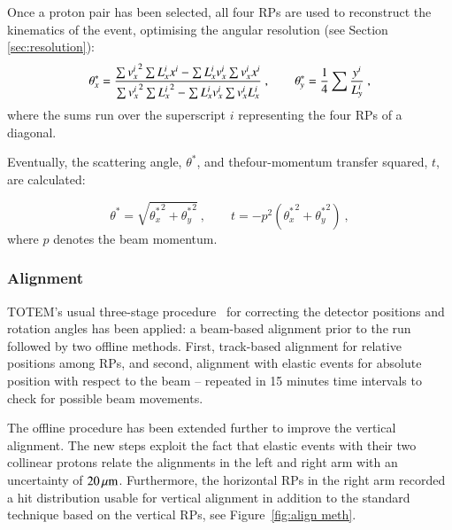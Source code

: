 Once a proton pair has been selected, all four RPs are used to reconstruct the kinematics of the event, optimising the angular resolution (see Section \ref{sec:resolution}):
\begin{equation}
\label{eq:kin 2a}
		\theta_x^* = {
				\sum {v_x^i}^2 \sum L_x^i x^i - \sum L_x^i v_x^i \sum v_x^i x^i
				\over
				\sum {v_x^i}^2 \sum {L_x^i}^2 - \sum L_x^i v_x^i \sum v_x^i L_x^i
			}\ ,\qquad
		\theta_y^* = {1\over 4} \sum {y^i\over L_y^i}\ ,
\end{equation}
where the sums run over the superscript $i$ representing the four RPs of a diagonal.

Eventually, the scattering angle, $\theta^*$, and the\Break four-momentum transfer squared, $t$, are calculated:

\begin{equation}
\label{eq:th t}
\theta^* = \sqrt{{\theta_x^*}^2 + {\theta_y^*}^2}\ ,\qquad t = - p^2 ({\theta_x^*}^2 + {\theta_y^*}^2)\ ,
\end{equation}
where $p$ denotes the beam momentum.



\subsubsection{Alignment}
\label{sec:alignment}

TOTEM's usual three-stage procedure~\cite{totem-ijmp} for correcting the detector positions and rotation angles  
has been applied: a beam-based alignment prior to the run followed by two offline methods. First, track-based alignment for relative positions among RPs, and second, alignment with elastic events for absolute position with respect to the beam -- repeated in 15 minutes time intervals to check for possible beam movements.

The offline procedure has been extended further to improve the vertical alignment. The new steps exploit the fact that elastic events with their two collinear protons relate the alignments in the left and right arm with an uncertainty of $20\,{\rm \mu m}$. Furthermore, the horizontal RPs in the right arm recorded a hit distribution usable for vertical alignment in addition to the standard technique based on the vertical RPs, see Figure~\ref{fig:align meth}.

